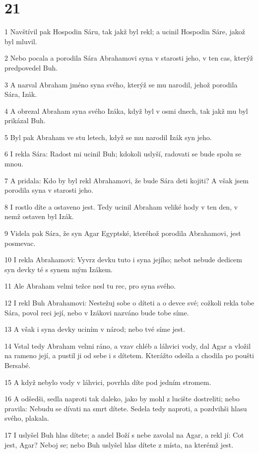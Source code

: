 \chapter{21}

\par 1 Navštívil pak Hospodin Sáru, tak jakž byl rekl; a ucinil Hospodin Sáre, jakož byl mluvil.
\par 2 Nebo pocala a porodila Sára Abrahamovi syna v starosti jeho, v ten cas, kterýž predpovedel Buh.
\par 3 A nazval Abraham jméno syna svého, kterýž se mu narodil, jehož porodila Sára, Izák.
\par 4 A obrezal Abraham syna svého Izáka, když byl v osmi dnech, tak jakž mu byl prikázal Buh.
\par 5 Byl pak Abraham ve stu letech, když se mu narodil Izák syn jeho.
\par 6 I rekla Sára: Radost mi ucinil Buh; kdokoli uslyší, radovati se bude spolu se mnou.
\par 7 A pridala: Kdo by byl rekl Abrahamovi, že bude Sára deti kojiti? A však jsem porodila syna v starosti jeho.
\par 8 I rostlo díte a ostaveno jest. Tedy ucinil Abraham veliké hody v ten den, v nemž ostaven byl Izák.
\par 9 Videla pak Sára, že syn Agar Egyptské, kteréhož porodila Abrahamovi, jest posmevac.
\par 10 I rekla Abrahamovi: Vyvrz devku tuto i syna jejího; nebot nebude dedicem syn devky té s synem mým Izákem.
\par 11 Ale Abraham velmi težce nesl tu rec, pro syna svého.
\par 12 I rekl Buh Abrahamovi: Nestežuj sobe o díteti a o devce své; cožkoli rekla tobe Sára, povol reci její, nebo v Izákovi nazváno bude tobe síme.
\par 13 A však i syna devky uciním v národ; nebo tvé síme jest.
\par 14 Vstal tedy Abraham velmi ráno, a vzav chléb a láhvici vody, dal Agar a vložil na rameno její, a pustil ji od sebe i s dítetem. Kterážto odešla a chodila po poušti Bersabé.
\par 15 A když nebylo vody v láhvici, povrhla díte pod jedním stromem.
\par 16 A odšedši, sedla naproti tak daleko, jako by mohl z lucište dostreliti; nebo pravila: Nebudu se dívati na smrt dítete. Sedela tedy naproti, a pozdvihši hlasu svého, plakala.
\par 17 I uslyšel Buh hlas dítete; a andel Boží s nebe zavolal na Agar, a rekl jí: Cot jest, Agar? Neboj se; nebo Buh uslyšel hlas dítete z místa, na kterémž jest.
